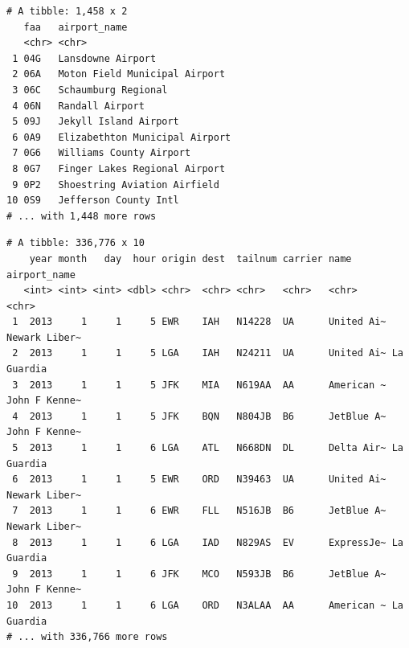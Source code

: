 \documentclass[
  11pt,
]{krantz}
\newenvironment{Shaded}{\begin{snugshade}}{\end{snugshade}}
\newcommand{\CommentTok}[1]{\textcolor[rgb]{0.37,0.37,0.37}{\textit{#1}}}
\newcommand{\DataTypeTok}[1]{\textcolor[rgb]{0.27,0.27,0.27}{#1}}
\newcommand{\KeywordTok}[1]{\textcolor[rgb]{0.27,0.27,0.27}{\textbf{#1}}}
\newcommand{\NormalTok}[1]{#1}
\newcommand{\OperatorTok}[1]{\textcolor[rgb]{0.43,0.43,0.43}{\textbf{#1}}}
\newcommand{\StringTok}[1]{\textcolor[rgb]{0.5,0.5,0.5}{#1}}
\begin{document}
\begin{Shaded}
\end{Shaded}

\begin{verbatim}
# A tibble: 1,458 x 2
   faa   airport_name                  
   <chr> <chr>                         
 1 04G   Lansdowne Airport             
 2 06A   Moton Field Municipal Airport 
 3 06C   Schaumburg Regional           
 4 06N   Randall Airport               
 5 09J   Jekyll Island Airport         
 6 0A9   Elizabethton Municipal Airport
 7 0G6   Williams County Airport       
 8 0G7   Finger Lakes Regional Airport 
 9 0P2   Shoestring Aviation Airfield  
10 0S9   Jefferson County Intl         
# ... with 1,448 more rows
\end{verbatim}

\begin{Shaded}
\end{Shaded}

\begin{verbatim}
# A tibble: 336,776 x 10
    year month   day  hour origin dest  tailnum carrier name       airport_name 
   <int> <int> <int> <dbl> <chr>  <chr> <chr>   <chr>   <chr>      <chr>        
 1  2013     1     1     5 EWR    IAH   N14228  UA      United Ai~ Newark Liber~
 2  2013     1     1     5 LGA    IAH   N24211  UA      United Ai~ La Guardia   
 3  2013     1     1     5 JFK    MIA   N619AA  AA      American ~ John F Kenne~
 4  2013     1     1     5 JFK    BQN   N804JB  B6      JetBlue A~ John F Kenne~
 5  2013     1     1     6 LGA    ATL   N668DN  DL      Delta Air~ La Guardia   
 6  2013     1     1     5 EWR    ORD   N39463  UA      United Ai~ Newark Liber~
 7  2013     1     1     6 EWR    FLL   N516JB  B6      JetBlue A~ Newark Liber~
 8  2013     1     1     6 LGA    IAD   N829AS  EV      ExpressJe~ La Guardia   
 9  2013     1     1     6 JFK    MCO   N593JB  B6      JetBlue A~ John F Kenne~
10  2013     1     1     6 LGA    ORD   N3ALAA  AA      American ~ La Guardia   
# ... with 336,766 more rows
\end{verbatim}
\end{document}
